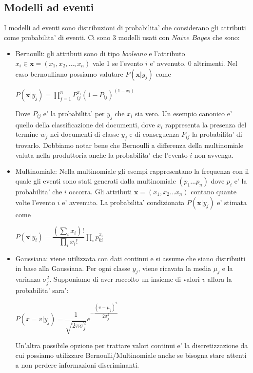\subsection{Modelli ad eventi}  
   I modelli ad eventi sono distribuzioni di probabilita' che considerano gli attributi come probabilita' di eventi. Ci sono 3 modelli usati con $\textit{Naive Bayes}$ che sono:
\begin{itemize}
	\item Bernoulli: gli attributi sono di tipo \textit{booleano} e l'attributo $x_i \in \textbf{x}=(x_1,x_2,...,x_n)$ vale 1 se l'evento $i$ e' avvenuto, 0 altrimenti. Nel caso bernoulliano possiamo valutare $P(\textbf{x}|y_j)$ come
	\begin{center}
	 $P(\textbf{x}|y_j) = \prod_{j=1}^{n} P_{ij}^{x_i} (1-P_{ij})^{(1-x_i)}$
	\end{center}
	Dove $P_{ij}$ e' la probabilita' per $y_j$ che $x_i$ sia vero. Un esempio canonico e' quello della classificazione dei documenti, dove $x_i$ rappresenta la presenza del termine $w_j$ nei documenti di classe $y_j$ e di conseguenza $P_{ij}$ la probabilita' di trovarlo. Dobbiamo notar bene che Bernoulli a differenza della multinomiale valuta nella produttoria anche la probabilita' che l'evento $i$ non avvenga.
	

	\item Multinomiale: Nella multinomiale gli esempi rappresentano la frequenza con il quale gli eventi sono stati generati dalla multinomiale $(p_1...p_n)$ dove $p_i$ e' la probabilita' che $i$ occorra. Gli attributi $\textbf{x}=(x_1,x_2...x_n)$ contano quante volte l'evento $i$ e' avvenuto. La probabilita' condizionata  $P(\textbf{x}|y_j)$ e' stimata come
	\begin{center}
		$P(\textbf{x}|y_i) = \dfrac{(\sum_{i}x_i)!}{\prod_{i}x_i!}\prod_i p_{ki}^{x_i}$
	\end{center}
	\item Gaussiana: viene utilizzata con dati continui e si assume che siano distribuiti in base alla Gaussiana. Per ogni classe $y_j$, viene ricavata la media $\mu_j$ e la varianza $\sigma_{j}^{2}$. Supponiamo di aver raccolto un insieme di valori $v$ allora la probabilita' sara':
	\begin{center}
		$P(x =v | y_j) = \dfrac{1}{\sqrt{2 \pi \sigma_{j}^2}} e^{-\dfrac{(v - \mu_j)^2}{2 \sigma_{j}^2}}$
	\end{center}
	Un'altra possibile opzione per trattare valori continui e' la discretizzazione da cui possiamo utilizzare Bernoulli/Multinomiale anche se bisogna stare attenti a non perdere informazioni discriminanti.
\end{itemize}

